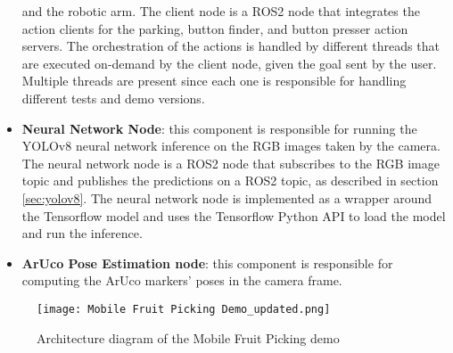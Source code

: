 \begin{itemize}
    and the robotic arm. The client node is a ROS2 node that integrates the action clients for the parking, button finder,
    and button presser action servers. The orchestration of the actions is handled by different threads that
    are executed on-demand by the client node, given the goal sent by the user. Multiple threads are present
    since each one is responsible for handling different tests and demo versions.
    \item \textbf{Neural Network Node}: this component is responsible for running the YOLOv8 neural network
    inference on the RGB images taken by the camera. The neural network node is a ROS2 node that subscribes
    to the RGB image topic and publishes the predictions on a ROS2 topic, as described in section \ref{sec:yolov8}.
    The neural network node is implemented as a wrapper around the Tensorflow model and uses the 
    Tensorflow Python API to load the model and run the inference.
    \item \textbf{ArUco Pose Estimation node}: this component is responsible for computing the ArUco markers' poses
    in the camera frame.
\end{itemize}

\begin{figure}[ht]
    \centering
    \texttt{[image: Mobile Fruit Picking Demo\_updated.png]}
    \caption{Architecture diagram of the Mobile Fruit Picking demo}
    \label{fig:arch2}
\end{figure}
